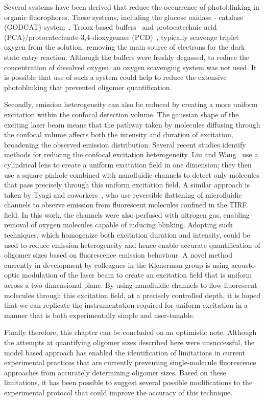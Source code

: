 Several systems have been derived that reduce the occurrence of photoblinking in organic fluorophores. These systems, including the glucose oxidase - catalase (GODCAT) system~\cite{joo2006}, Trolox-based buffers~\cite{rasnik2006} and protocatechuic acid (PCA)/protocatechuate-3,4-dioxygenase (PCD)~\cite{aitken2008}, typically scavenge triplet oxygen from the solution, removing the main source of electrons for the dark state entry reaction. Although the buffers were freshly degassed, to reduce the concentration of dissolved oxygen, an oxygen scavenging system was not used. It is possible that use of such a system could help to reduce the extensive photoblinking that prevented oligomer quantification. 

Secondly, emission heterogeneity can also be reduced by creating a more uniform excitation within the confocal detection volume. The gaussian shape of the exciting laser beam means that the pathway taken by molecules diffusing through the confocal volume affects both the intensity and duration of excitation, broadening the observed emission distribution. Several recent studies identify methods for reducing the confocal excitation heterogeneity. Liu and Wang~\cite{liu2008} use a cylindrical lens to create a uniform excitation field in one dimension; they then use a square pinhole combined with nanofluidic channels to detect only molecules that pass precisely through this uniform excitation field. A similar approach is taken by Tyagi and coworkers~\cite{tyagi2014}, who use reversible flattening of microfluidic channels to observe emission from fluorescent molecules confined in the TIRF field. In this work, the channels were also perfused with nitrogen gas, enabling removal of oxygen molecules capable of inducing blinking. Adopting such techniques, which homogenize both excitation duration and intensity, could be used to reduce emission heterogeneity and hence enable accurate quantification of oligomer sizes based on fluorescence emission behaviour. A novel method currently in development by colleagues in the Klenerman group is using acousto-optic modulation of the laser beam to create an excitation field that is uniform across a two-dimensional plane. By using nanofluidic channels to flow fluorescent  molecules through this excitation field, at a precisely controlled depth, it is hoped that we can replicate the instrumentation required for uniform excitation in a manner that is both experimentally simple and user-tunable.  

Finally therefore, this chapter can be concluded on an optimistic note. Although the attempts at quantifying oligomer sizes described here were unsuccessful, the model based approach has enabled the identification of limitations in current experimental practices that are currently preventing single-molecule fluorescence approaches from accurately determining oligomer sizes. Based on these limitations, it has been possible to suggest several possible modifications to the experimental protocol that could improve the accuracy of this technique.